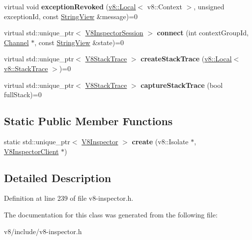 \begin{DoxyCompactItemize}
\item 
\mbox{\label{classv8__inspector_1_1V8Inspector_a6853e6b53df0a0058b0e7ff2a3cc94ec}} 
virtual void {\bfseries exception\+Revoked} (\mbox{\hyperlink{classv8_1_1Local}{v8\+::\+Local}}$<$ v8\+::\+Context $>$, unsigned exception\+Id, const \mbox{\hyperlink{classv8__inspector_1_1StringView}{String\+View}} \&message)=0
\item 
\mbox{\label{classv8__inspector_1_1V8Inspector_ada36fa35ede4b3fda70b07fc855458e4}} 
virtual std\+::unique\+\_\+ptr$<$ \mbox{\hyperlink{classv8__inspector_1_1V8InspectorSession}{V8\+Inspector\+Session}} $>$ {\bfseries connect} (int context\+Group\+Id, \mbox{\hyperlink{classv8__inspector_1_1V8Inspector_1_1Channel}{Channel}} $\ast$, const \mbox{\hyperlink{classv8__inspector_1_1StringView}{String\+View}} \&state)=0
\item 
\mbox{\label{classv8__inspector_1_1V8Inspector_a4ac935e4871eef8ee5cb2e5ca41a2142}} 
virtual std\+::unique\+\_\+ptr$<$ \mbox{\hyperlink{classv8__inspector_1_1V8StackTrace}{V8\+Stack\+Trace}} $>$ {\bfseries create\+Stack\+Trace} (\mbox{\hyperlink{classv8_1_1Local}{v8\+::\+Local}}$<$ \mbox{\hyperlink{classv8_1_1StackTrace}{v8\+::\+Stack\+Trace}} $>$)=0
\item 
\mbox{\label{classv8__inspector_1_1V8Inspector_a22af900e1627ca8ef9382c0507645d70}} 
virtual std\+::unique\+\_\+ptr$<$ \mbox{\hyperlink{classv8__inspector_1_1V8StackTrace}{V8\+Stack\+Trace}} $>$ {\bfseries capture\+Stack\+Trace} (bool full\+Stack)=0
\end{DoxyCompactItemize}
\subsection*{Static Public Member Functions}
\begin{DoxyCompactItemize}
\item 
\mbox{\label{classv8__inspector_1_1V8Inspector_ac7b64842334aadde7dabff1ac6d82cff}} 
static std\+::unique\+\_\+ptr$<$ \mbox{\hyperlink{classv8__inspector_1_1V8Inspector}{V8\+Inspector}} $>$ {\bfseries create} (v8\+::\+Isolate $\ast$, \mbox{\hyperlink{classv8__inspector_1_1V8InspectorClient}{V8\+Inspector\+Client}} $\ast$)
\end{DoxyCompactItemize}


\subsection{Detailed Description}


Definition at line 239 of file v8-\/inspector.\+h.



The documentation for this class was generated from the following file\+:\begin{DoxyCompactItemize}
\item 
v8/include/v8-\/inspector.\+h\end{DoxyCompactItemize}
